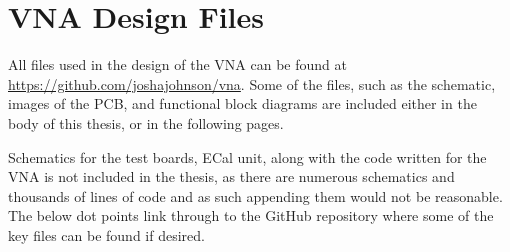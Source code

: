 \section{VNA Design Files}
\label{appen:vna_design_files}

All files used in the design of the VNA can be found at \url{https://github.com/joshajohnson/vna}. 
Some of the files, such as the schematic, images of the PCB, and functional block diagrams are included either in the body of this thesis, or in the following pages. 

Schematics for the test boards, ECal unit, along with the code written for the VNA is not included in the thesis, as there are numerous schematics and thousands of lines of code and as such appending them would not be reasonable. The below dot points link through to the GitHub repository where some of the key files can be found if desired. 

